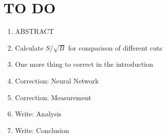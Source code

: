 \chapter{TO DO}
\begin{enumerate}
    \item ABSTRACT
    \item Calculate $S/\sqrt{B}$ for comparison of different cuts
    \item One more thing to correct in the introduction
    \item Correction: Neural Network 
    \item Correction: Measurement
    \item Write: Analysis
    \item Write: Conclusion
\end{enumerate}